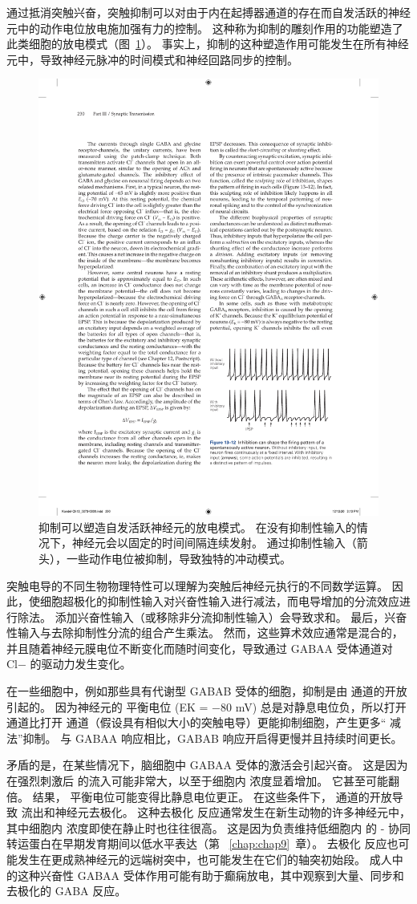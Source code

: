 通过抵消突触兴奋，突触抑制可以对由于内在起搏器通道的存在而自发活跃的神经元中的动作电位放电施加强有力的控制。
这种称为抑制的雕刻作用的功能塑造了此类细胞的放电模式（图~\ref{fig:13_12}）。 
事实上，抑制的这种塑造作用可能发生在所有神经元中，导致神经元脉冲的时间模式和神经回路同步的控制。


\begin{figure}[htbp]
	\centering
	\includegraphics[width=0.5\linewidth]{chap13/fig_13_12}
	\caption{抑制可以塑造自发活跃神经元的放电模式。 在没有抑制性输入的情况下，神经元会以固定的时间间隔连续发射。 通过抑制性输入（箭头），一些动作电位被抑制，导致独特的冲动模式。}
	\label{fig:13_12}
\end{figure}


突触电导的不同生物物理特性可以理解为突触后神经元执行的不同数学运算。
因此，使细胞超极化的抑制性输入对兴奋性输入进行减法，而电导增加的分流效应进行除法。
添加兴奋性输入（或移除非分流抑制性输入）会导致求和。
最后，兴奋性输入与去除抑制性分流的组合产生乘法。
然而，这些算术效应通常是混合的，并且随着神经元膜电位不断变化而随时间变化，导致通过 GABAA 受体通道对 Cl− 的驱动力发生变化。


在一些细胞中，例如那些具有代谢型 GABAB 受体的细胞，抑制是由  通道的开放引起的。
因为神经元的  平衡电位 (EK = −80 mV) 总是对静息电位负，所以打开  通道比打开  通道（假设具有相似大小的突触电导）更能抑制细胞，产生更多“ 减法”抑制。
与 GABAA 响应相比，GABAB 响应开启得更慢并且持续时间更长。


矛盾的是，在某些情况下，脑细胞中 GABAA 受体的激活会引起兴奋。
这是因为在强烈刺激后  的流入可能非常大，以至于细胞内  浓度显着增加。
它甚至可能翻倍。
结果， 平衡电位可能变得比静息电位更正。
在这些条件下， 通道的开放导致  流出和神经元去极化。
这种去极化  反应通常发生在新生动物的许多神经元中，其中细胞内  浓度即使在静止时也往往很高。
这是因为负责维持低细胞内  的 - 协同转运蛋白在早期发育期间以低水平表达（第 ~\ref{chap:chap9}~章）。
去极化  反应也可能发生在更成熟神经元的远端树突中，也可能发生在它们的轴突初始段。
成人中的这种兴奋性 GABAA 受体作用可能有助于癫痫放电，其中观察到大量、同步和去极化的 GABA 反应。



